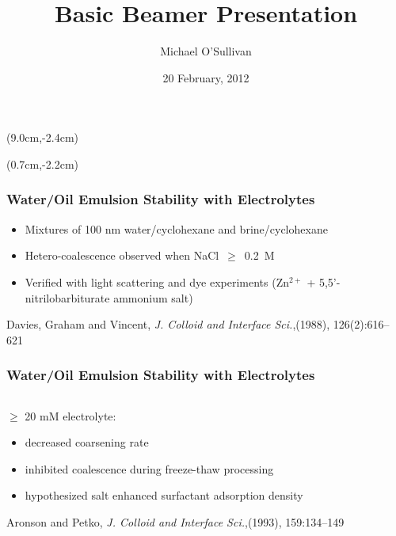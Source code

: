 \documentclass[10pt]{beamer}
\title{Basic Beamer Presentation}
\author[MOS]{Michael O'Sullivan}
\date{20 February, 2012}
\begin{document}

\begin{frame}
 \maketitle
\begin{textblock*}{2cm}(9.0cm,-2.4cm)
\end{textblock*}
\begin{textblock*}{2.0cm}(0.7cm,-2.2cm)
\end{textblock*}
\end{frame}


\begin{frame}
\frametitle{Water/Oil Emulsion Stability with Electrolytes}
\vspace{5mm}
\begin{itemize}
 \item Mixtures of 100 nm water/cyclohexane and brine/cyclohexane
\item Hetero-coalescence observed when NaCl~$\geq$~0.2~M
\item Verified with light scattering and dye experiments (Zn$^{2+}$ + 5,5'-nitrilobarbiturate ammonium salt)
\end{itemize}
\vspace{5mm}
Davies, Graham and Vincent, {\em J. Colloid and Interface Sci.},(1988), 126(2):616--621
\end{frame}


\begin{frame}
 \frametitle{Water/Oil Emulsion Stability with Electrolytes}
\begin{columns}

\begin{column}{0.5\textwidth}
$\geq$ 20 mM electrolyte: \\
\begin{itemize}
 \item decreased coarsening rate
\item inhibited coalescence during freeze-thaw processing
\item hypothesized salt enhanced surfactant adsorption density
\end{itemize}

\vspace{5mm}

Aronson and Petko, {\em J. Colloid and Interface Sci.},(1993), 159:134--149
 \end{column}

 \begin{column}{0.5\textwidth}
 \end{column}
\end{columns}

\end{frame}
\end{document}
